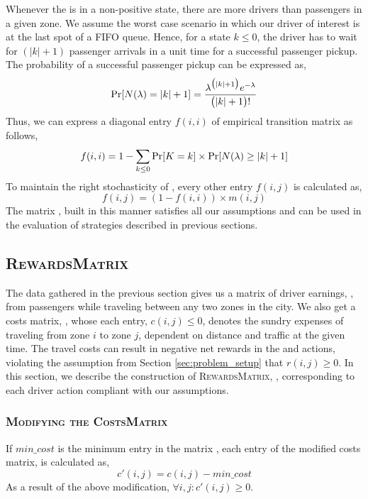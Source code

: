 Whenever the {\markovchain} is in a non-positive state, there are more drivers than passengers in a given zone. We assume the worst case scenario in which our driver of interest is at the last spot of a FIFO queue. Hence, for a state $k \leq 0$, the driver has to wait for $(|k| + 1)$ passenger arrivals in a unit time for a successful passenger pickup. The probability of a successful passenger pickup can be expressed as,
\begin{equation}
\Pr[N(\lambda) = |k| + 1] = \frac{\lambda^{\big(|k|+1\big)} e^{-\lambda}}{\big(|k| + 1\big)!}
\end{equation}
Thus, we can express a diagonal entry $f(i,i)$ of empirical transition matrix as follows,
\begin{equation}
f(i,i) = 1 - \sum_{k \leq 0} \Pr[K = k] \times \Pr[N(\lambda) \geq |k| + 1]
\end{equation}
To maintain the right stochasticity of {\empiricaltransitionmatrix}, every other entry $f(i,j)$ is calculated as,
\begin{equation}
f(i,j) = (1 - f(i,i)) \times m(i,j)
\end{equation}
The matrix {\empiricaltransitionmatrix}, built in this manner satisfies all our assumptions and can be used in the evaluation of strategies described in previous sections.

\subsection{\textsc{RewardsMatrix}}

The data gathered in the previous section gives us a matrix of driver earnings, , from passengers while traveling between any two zones in the city. We also get a costs matrix, , whose each entry, $c(i,j) \leq 0$, denotes the sundry expenses of traveling from zone $i$ to zone $j$, dependent on distance and traffic at the given time. The travel costs can result in negative net rewards in the {\gohome} and {\relocate} actions, violating the assumption from Section \ref{sec:problem_setup} that $r(i,j) \geq 0$. In this section, we describe the construction of \textsc{RewardsMatrix}, {\rewardsmatrix}, corresponding to each driver action compliant with our assumptions.

\subsubsection{\textsc{Modifying the CostsMatrix}}
If $min\_cost$ is the minimum entry in the matrix , each entry of the modified costs matrix,  is calculated as,
\begin{equation}
c'(i,j) = c(i,j) - min\_cost
\end{equation}
As a result of the above modification, $\forall i,j : c'(i,j) \geq 0$.

